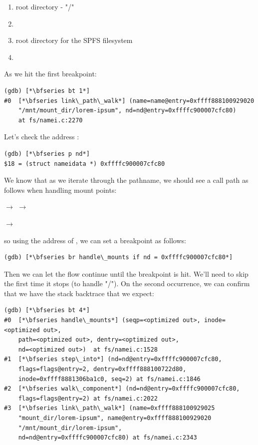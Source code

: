 \begin{enumerate}
    \item root directory - "/"
    \item {}
    \item root directory for the SPFS filesystem
    \item {}
\end{enumerate}

\noindent
As we hit the first breakpoint:

\begin{lstlisting}
(gdb) [*\bfseries bt 1*]
#0  [*\bfseries link\_path\_walk*] (name=name@entry=0xffff888100929020 
    "/mnt/mount_dir/lorem-ipsum", nd=nd@entry=0xffffc900007cfc80) 
    at fs/namei.c:2270
\end{lstlisting} 

\noindent
Let's check the address :

\begin{lstlisting}
(gdb) [*\bfseries p nd*]
$18 = (struct nameidata *) 0xffffc900007cfc80
\end{lstlisting} 

\noindent
We know that as we iterate through the pathname, we should see a call path as follows when handling mount points:

\small
\bigskip
{} $\rightarrow$   $\rightarrow$  

\hspace{3.2in}$\rightarrow$ 
\bigskip
\normalsize

\noindent
so using the address of , we can set a breakpoint as follows:

\begin{lstlisting}
(gdb) [*\bfseries br handle\_mounts if nd = 0xffffc900007cfc80*]
\end{lstlisting}

\noindent
Then we can let the flow continue until the breakpoint is hit. We'll need to skip the first time it stops (to handle "/"). On the second occurrence, we can confirm that we have the stack backtrace that we expect:

\begin{lstlisting}
(gdb) [*\bfseries bt 4*]
#0  [*\bfseries handle\_mounts*] (seqp=<optimized out>, inode=<optimized out>, 
    path=<optimized out>, dentry=<optimized out>, 
    nd=<optimized out>)  at fs/namei.c:1528
#1  [*\bfseries step\_into*] (nd=nd@entry=0xffffc900007cfc80, 
    flags=flags@entry=2, dentry=0xffff888100722d80, 
    inode=0xffff8881306ba1c0, seq=2) at fs/namei.c:1846
#2  [*\bfseries walk\_component*] (nd=nd@entry=0xffffc900007cfc80, 
    flags=flags@entry=2) at fs/namei.c:2022
#3  [*\bfseries link\_path\_walk*] (name=0xffff888100929025 
    "mount_dir/lorem-ipsum", name@entry=0xffff888100929020 
    "/mnt/mount_dir/lorem-ipsum", 
    nd=nd@entry=0xffffc900007cfc80) at fs/namei.c:2343
\end{lstlisting}

